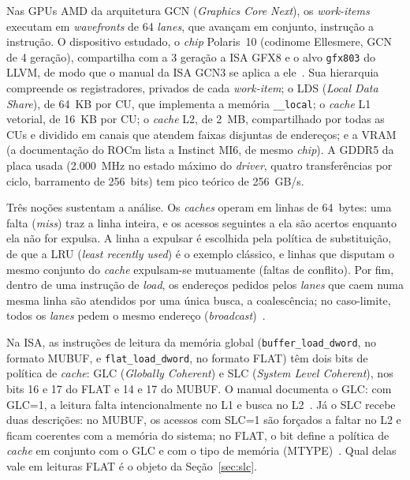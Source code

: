 \documentclass[12pt]{article}
\begin{document}
Nas GPUs AMD da arquitetura GCN (\textit{Graphics Core Next}), os \textit{work-items} executam em \textit{wavefronts} de 64 \textit{lanes}, que avançam em conjunto, instrução a instrução. O dispositivo estudado, o \textit{chip} Polaris~10 (codinome Ellesmere, GCN de 4\textordfeminine{} geração), compartilha com a 3\textordfeminine{} geração a ISA GFX8 e o alvo \texttt{gfx803} do LLVM, de modo que o manual da ISA GCN3 se aplica a ele~\cite{rocmspecs, amdgcn3}. Sua hierarquia compreende os registradores, privados de cada \textit{work-item}; o LDS (\textit{Local Data Share}), de 64~KB por CU, que implementa a memória \texttt{\_\_local}; o \textit{cache} L1 vetorial, de 16~KB por CU; o \textit{cache} L2, de 2~MB, compartilhado por todas as CUs e dividido em canais que atendem faixas disjuntas de endereços; e a VRAM~\cite{rocmspecs, llvmamdgpu} (a documentação do ROCm lista a Instinct MI6, de mesmo \textit{chip}). A GDDR5 da placa usada (2.000~MHz no estado máximo do \textit{driver}, quatro transferências por ciclo, barramento de 256~bits) tem pico teórico de 256~GB/s.

Três noções sustentam a análise. Os \textit{caches} operam em linhas de 64~bytes: uma falta (\textit{miss}) traz a linha inteira, e os acessos seguintes a ela são acertos enquanto ela não for expulsa. A linha a expulsar é escolhida pela política de substituição, de que a LRU (\textit{least recently used}) é o exemplo clássico, e linhas que disputam o mesmo conjunto do \textit{cache} expulsam-se mutuamente (faltas de conflito). Por fim, dentro de uma instrução de \textit{load}, os endereços pedidos pelos \textit{lanes} que caem numa mesma linha são atendidos por uma única busca, a coalescência; no caso-limite, todos os \textit{lanes} pedem o mesmo endereço (\textit{broadcast})~\cite[Seção~8.1.9]{amdgcn3}.

Na ISA, as instruções de leitura da memória global (\texttt{buffer\_load\_dword}, no formato MUBUF, e \texttt{flat\_load\_dword}, no formato FLAT) têm dois bits de política de \textit{cache}: GLC (\textit{Globally Coherent}) e SLC (\textit{System Level Coherent}), nos bits 16 e 17 do FLAT e 14 e 17 do MUBUF. O manual documenta o GLC: com GLC=1, a leitura falta intencionalmente no L1 e busca no L2~\cite[Seção~8.1.9]{amdgcn3}. Já o SLC recebe duas descrições: no MUBUF, os acessos com SLC=1 são forçados a faltar no L2 e ficam coerentes com a memória do sistema; no FLAT, o bit define a política de \textit{cache} em conjunto com o GLC e com o tipo de memória (MTYPE)~\cite[Tabelas~8.2 e~9.1]{amdgcn3}. Qual delas vale em leituras FLAT é o objeto da Seção~\ref{sec:slc}.
\end{document}
